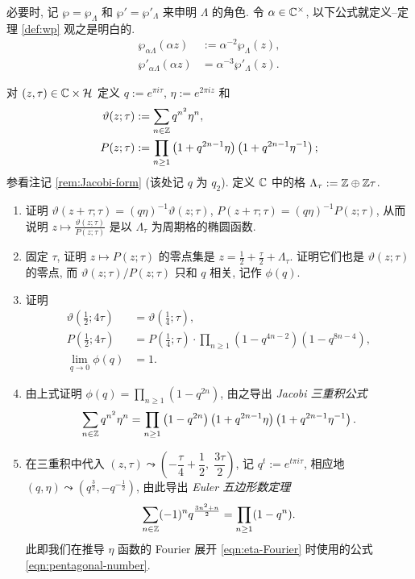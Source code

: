 必要时, 记 $\wp = \wp_\Lambda$ 和 $\wp' = \wp'_\Lambda$ 来申明 $\Lambda$ 的角色. 令 $\alpha \in \mathbb{C}^\times$, 以下公式就定义--定理 \ref{def:wp} 观之是明白的.
\begin{align*}
	\wp_{\alpha\Lambda}(\alpha z) & := \alpha^{-2} \wp_\Lambda(z), \\
	\wp'_{\alpha\Lambda}(\alpha z) & = \alpha^{-3} \wp'_\Lambda(z).
\end{align*}

\begin{exercise}\label{exo:triple-product}
	对 $(z,\tau) \in \mathbb{C} \times \mathcal{H}$ 定义 $q := e^{\pi i\tau}$, $\eta := e^{2\pi i z}$ 和
	\begin{align*}
		\vartheta(z; \tau) & := \sum_{n \in \mathbb{Z}} q^{n^2} \eta^n, \\
		P(z; \tau) & := \prod_{n \geq 1} \left(1 + q^{2n-1} \eta \right) \left(1 + q^{2n-1} \eta^{-1} \right);
	\end{align*}
	参看注记 \ref{rem:Jacobi-form} (该处记 $q$ 为 $q_2$). 定义 $\mathbb{C}$ 中的格 $\Lambda_\tau := \mathbb{Z} \oplus \mathbb{Z}\tau$.
	\begin{enumerate}
		\item 证明 $\vartheta(z + \tau; \tau) = (q\eta)^{-1}\vartheta(z; \tau)$, $P(z + \tau; \tau) = (q\eta)^{-1} P(z; \tau)$, 从而说明 $z \mapsto \frac{\vartheta(z;\tau)}{P(z;\tau)}$ 是以 $\Lambda_\tau$ 为周期格的椭圆函数.
		\item 固定 $\tau$, 证明 $z \mapsto P(z; \tau)$ 的零点集是 $z = \frac{1}{2} + \frac{\tau}{2} + \Lambda_\tau$. 证明它们也是 $\vartheta(z; \tau)$ 的零点, 而 $\vartheta(z;\tau)/P(z;\tau)$ 只和 $q$ 相关, 记作 $\phi(q)$.
		\item 证明
		\begin{align*}
			\vartheta\left( \frac{1}{2}; 4\tau \right) & = \vartheta\left( \frac{1}{4}; \tau \right), \\
			P\left( \frac{1}{2}; 4\tau \right) & = P\left( \frac{1}{4}; \tau\right) \cdot \prod_{n \geq 1} \left(1 - q^{4n-2} \right)\left( 1 - q^{8n-4} \right), \\
			\lim_{q \to 0} \phi(q) & = 1.
		\end{align*}
		\item 由上式证明 $\phi(q) = \prod_{n \geq 1} (1 - q^{2n})$, 由之导出 \emph{Jacobi 三重积公式} 
		\[ \sum_{n \in \mathbb{Z}} q^{n^2} \eta^n = \prod_{n \geq 1} \left( 1 - q^{2n} \right) \left( 1 + q^{2n-1}\eta \right) \left( 1 + q^{2n-1} \eta^{-1} \right). \]
		\item 在三重积中代入 $(z, \tau) \leadsto \left( -\dfrac{\tau}{4} + \dfrac{1}{2}, \; \dfrac{3\tau}{2} \right)$, 记 $q^t := e^{t\pi i \tau}$, 相应地 $(q, \eta) \leadsto (q^{\frac{3}{2}}, -q^{-\frac{1}{2}})$, 由此导出 \emph{Euler 五边形数定理} 
		\[ \sum_{n \in \mathbb{Z}} (-1)^n q^{ \frac{3n^2 + n}{2} } = \prod_{n \geq 1} (1 - q^n). \]
		此即我们在推导 $\eta$ 函数的 Fourier 展开 \eqref{eqn:eta-Fourier} 时使用的公式 \eqref{eqn:pentagonal-number}.
	\end{enumerate}
\end{exercise}

